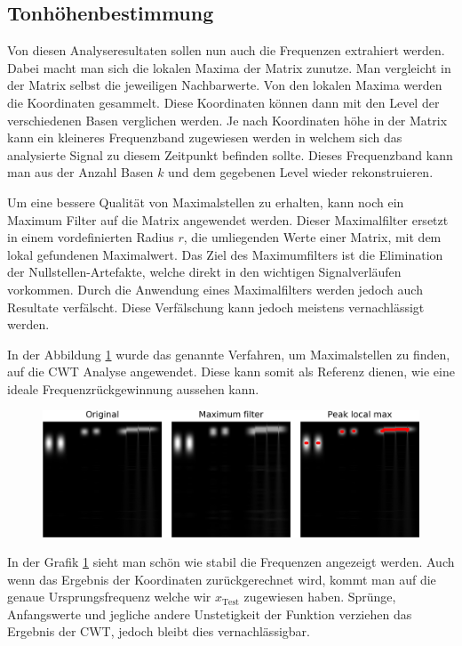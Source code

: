 \subsection{Tonhöhenbestimmung}

Von diesen Analyseresultaten sollen nun auch die Frequenzen extrahiert werden. Dabei macht man sich die lokalen Maxima der Matrix zunutze. Man vergleicht in der Matrix selbst die jeweiligen Nachbarwerte. Von den lokalen Maxima werden die Koordinaten gesammelt. Diese Koordinaten können dann mit den Level der verschiedenen Basen verglichen werden. Je nach Koordinaten höhe in der Matrix kann ein kleineres Frequenzband zugewiesen werden in welchem sich das analysierte Signal zu diesem Zeitpunkt befinden sollte. Dieses Frequenzband kann man aus der Anzahl Basen $k$  und dem gegebenen Level wieder rekonstruieren.

Um eine bessere Qualität von Maximalstellen zu erhalten, kann noch ein Maximum Filter auf die Matrix angewendet werden. Dieser Maximalfilter ersetzt in einem vordefinierten Radius $r$, die umliegenden Werte einer Matrix, mit dem lokal gefundenen Maximalwert. Das Ziel des Maximumfilters ist die Elimination der Nullstellen-Artefakte, welche direkt in den wichtigen Signalverläufen vorkommen. Durch die Anwendung eines Maximalfilters werden jedoch auch Resultate verfälscht. Diese Verfälschung kann jedoch meistens vernachlässigt werden.

In der Abbildung \ref{fig:cwt_max} wurde das genannte Verfahren, um Maximalstellen zu finden, auf die CWT Analyse angewendet. Diese kann somit als Referenz dienen, wie eine ideale Frequenzrückgewinnung aussehen kann. 

\begin{figure}
\centering
\includegraphics[width=\linewidth]{papers/autotune/sections/frames/images/cwtmaxima-clipped.jpg}
\label{fig:cwt_max}
\end{figure}%

In der Grafik \ref{fig:cwt_max} sieht man schön wie stabil die Frequenzen angezeigt werden. Auch wenn das Ergebnis der Koordinaten zurückgerechnet wird, kommt man auf die genaue Ursprungsfrequenz welche wir $x_{\text{Test}}$ zugewiesen haben. Sprünge, Anfangswerte und jegliche andere Unstetigkeit der Funktion verziehen das Ergebnis der CWT, jedoch bleibt dies vernachlässigbar.


